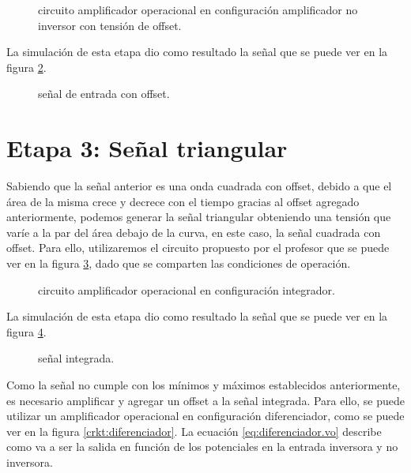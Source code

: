 \begin{figure}[!ht]
  \centering
  
  \caption{circuito amplificador operacional en configuración amplificador no inversor con tensión de offset.}
  \label{crkt:offset}
\end{figure}

La simulación de esta etapa dio como resultado la señal que se puede ver en la figura \ref{plot:offset}.

\begin{figure}[!ht]
  \centering
  
  \caption{señal de entrada con offset.}
  \label{plot:offset}
\end{figure}

\section{Etapa 3: Señal triangular}
Sabiendo que la señal anterior es una onda cuadrada con offset, debido a que el área de la misma crece y decrece con el
tiempo gracias al offset agregado anteriormente, podemos generar la señal triangular obteniendo una tensión que
varíe a la par del área debajo de la curva, en este caso, la señal cuadrada con offset. Para ello, utilizaremos el
circuito propuesto por el profesor que se puede ver en la figura \ref{crkt:integrador}, dado que se comparten las
condiciones de operación.

\begin{figure}[!ht]
  \centering
  
  \caption{circuito amplificador operacional en configuración integrador.}
  \label{crkt:integrador}
\end{figure}

La simulación de esta etapa dio como resultado la señal que se puede ver en la figura \ref{plot:integrador.pre}.

\begin{figure}[!ht]
  \centering
  
  \caption{señal integrada.}
  \label{plot:integrador.pre}
\end{figure}

Como la señal no cumple con los mínimos y máximos establecidos anteriormente, es necesario amplificar y agregar un
offset a la señal integrada. Para ello, se puede utilizar un amplificador operacional en configuración diferenciador,
como se puede ver en la figura \ref{crkt:diferenciador}. La ecuación \ref{eq:diferenciador.vo} describe como va a ser la
salida en función de los potenciales en la entrada inversora y no inversora.

